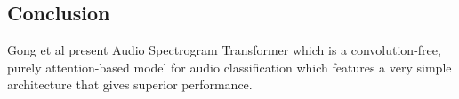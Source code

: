 \subsection{Conclusion}
\par Gong et al present Audio Spectrogram Transformer which is a convolution-free, purely attention-based model for audio classification which features a very simple architecture that gives superior performance.

